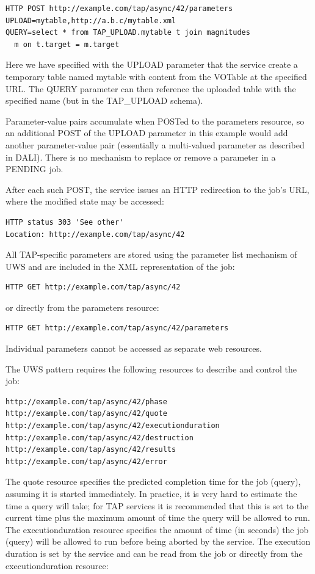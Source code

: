 \documentclass[11pt,letter]{ivoa}
\newcommand{\tapupload}{TAP\_UPLOAD}
\newcommand{\tapupload}{%
  {\relsize{-0.5}TAP\discretionary{-}{}{\kern-2pt\_}UPLOAD}}
\begin{document}
\begin{verbatim}
HTTP POST http://example.com/tap/async/42/parameters
UPLOAD=mytable,http://a.b.c/mytable.xml
QUERY=select * from TAP_UPLOAD.mytable t join magnitudes 
  m on t.target = m.target
\end{verbatim}

Here we have specified with the UPLOAD parameter that the service create a 
temporary table named mytable with content from the VOTable at the specified 
URL. The QUERY parameter can then reference the uploaded table with the 
specified name (but in the \tapupload{} schema).

Parameter-value pairs accumulate when POSTed to the parameters resource, so an 
additional POST of the UPLOAD parameter in this example would add another 
parameter-value pair (essentially a multi-valued parameter as described in 
DALI). There is no mechanism to replace or remove a parameter in a 
PENDING job.

After each such POST, the service issues an HTTP redirection to the job's URL, 
where the modified state may be accessed:

\begin{verbatim}
HTTP status 303 'See other'
Location: http://example.com/tap/async/42
\end{verbatim}

All TAP-specific parameters are stored using the parameter list mechanism of 
UWS and are included in the XML representation of the job:
\begin{verbatim}
HTTP GET http://example.com/tap/async/42
\end{verbatim}
or directly from the parameters resource:
\begin{verbatim}
HTTP GET http://example.com/tap/async/42/parameters
\end{verbatim}
Individual parameters cannot be accessed as separate web resources.

The UWS pattern requires the following resources to describe and control the 
job:
\begin{verbatim}
http://example.com/tap/async/42/phase
http://example.com/tap/async/42/quote
http://example.com/tap/async/42/executionduration
http://example.com/tap/async/42/destruction
http://example.com/tap/async/42/results
http://example.com/tap/async/42/error
\end{verbatim}
The quote resource specifies the predicted completion time for the job (query), 
assuming it is started immediately. In practice, it is very hard to estimate the 
time a query will take; for TAP services it is recommended that this is set to 
the current time plus the maximum amount of time the query will be allowed to 
run. The executionduration resource specifies the amount of time (in seconds) 
the job (query) will be allowed to run before being aborted by the service. The 
execution duration is set by the service and can be read from the job or 
directly from the executionduration resource:
\end{document}
